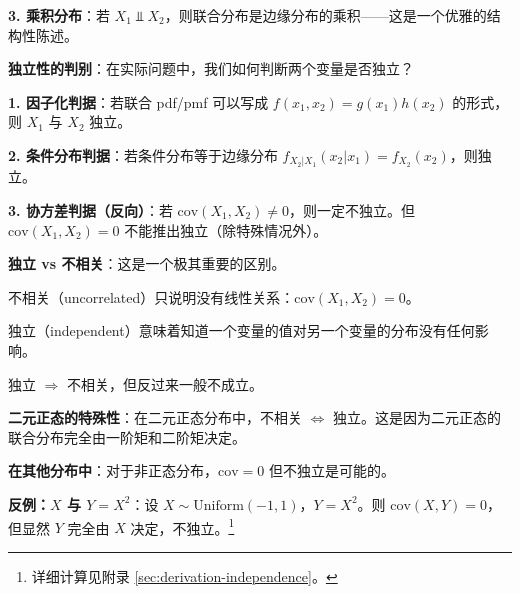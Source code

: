 \textbf{3. 乘积分布}：若 $X_1 \Perp X_2$，则联合分布是边缘分布的乘积——这是一个优雅的结构性陈述。

\textbf{独立性的判别}：在实际问题中，我们如何判断两个变量是否独立？

\textbf{1. 因子化判据}：若联合 pdf/pmf 可以写成 $f(x_1, x_2) = g(x_1)h(x_2)$ 的形式，则 $X_1$ 与 $X_2$ 独立。

\textbf{2. 条件分布判据}：若条件分布等于边缘分布 $f_{X_2|X_1}(x_2|x_1) = f_{X_2}(x_2)$，则独立。

\textbf{3. 协方差判据（反向）}：若 $\text{cov}(X_1, X_2) \neq 0$，则一定不独立。但 $\text{cov}(X_1, X_2) = 0$ 不能推出独立（除特殊情况外）。

\textbf{独立 vs 不相关}：这是一个极其重要的区别。

不相关（uncorrelated）只说明没有线性关系：$\text{cov}(X_1, X_2) = 0$。

独立（independent）意味着知道一个变量的值对另一个变量的分布没有任何影响。

独立 $\Rightarrow$ 不相关，但反过来一般不成立。

\textbf{二元正态的特殊性}：在二元正态分布中，不相关 $\iff$ 独立。这是因为二元正态的联合分布完全由一阶矩和二阶矩决定。

\textbf{在其他分布中}：对于非正态分布，$\text{cov} = 0$ 但不独立是可能的。

\textbf{反例：$X$ 与 $Y = X^2$}：设 $X \sim \text{Uniform}(-1, 1)$，$Y = X^2$。则 $\text{cov}(X, Y) = 0$，但显然 $Y$ 完全由 $X$ 决定，不独立。\footnote{详细计算见附录 \cref{sec:derivation-independence}。}

